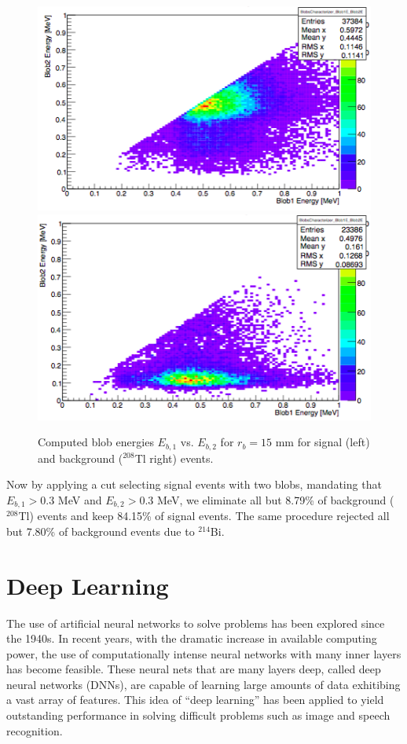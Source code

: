 \documentclass{JINST}
\begin{document}
\begin{figure}[!htb]
	\centering
	\includegraphics[scale = 0.45]{fig/blobcuts_bb0nu_2x2x2_E1vsE2.png}
	\includegraphics[scale = 0.45]{fig/blobcuts_Tl208_2x2x2_E1vsE2.png}
	\caption{Computed blob energies $E_{b,1}$ vs. $E_{b,2}$ for $r_b = 15$ mm for signal (left) and background ($^{208}$Tl right) events.} \label{fig.blobcuts}
\end{figure}

Now by applying a cut selecting signal events with two blobs, mandating that $E_{b,1} > 0.3$ MeV and $E_{b,2} > 0.3$ MeV, we eliminate all but 8.79\% of background ($^{208}$Tl) events 
and keep 84.15\% of signal events.  The same procedure rejected all but 7.80\% of background events due to $^{214}$Bi.

\section{Deep Learning}
The use of artificial neural networks to solve problems has been explored since the 1940s.  In recent years, with the dramatic increase in available computing power, the use of computationally
intense neural networks with many inner layers has become feasible.  These neural nets that are many layers deep, called deep neural networks (DNNs), are capable of learning large
amounts of data exhitibing a vast array of features.  This idea of ``deep learning'' has been applied to yield outstanding performance in solving difficult problems such as image and 
speech recognition.
\end{document}
